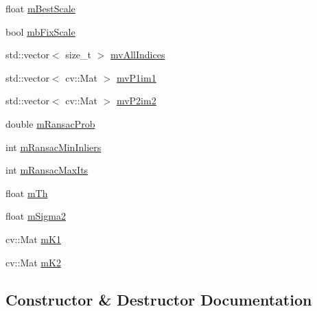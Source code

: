\begin{DoxyCompactItemize}
\item 
float \mbox{\hyperlink{class_o_r_b___s_l_a_m2_1_1_sim3_solver_ab10aee88f18c5a5b80aabb5c21a6489c}{m\+Best\+Scale}}
\item 
bool \mbox{\hyperlink{class_o_r_b___s_l_a_m2_1_1_sim3_solver_a39aa9674bb73b257e0d834cbec52acce}{mb\+Fix\+Scale}}
\item 
std\+::vector$<$ size\+\_\+t $>$ \mbox{\hyperlink{class_o_r_b___s_l_a_m2_1_1_sim3_solver_abcc39b417f6d09e436d39712fb2a2b11}{mv\+All\+Indices}}
\item 
std\+::vector$<$ cv\+::\+Mat $>$ \mbox{\hyperlink{class_o_r_b___s_l_a_m2_1_1_sim3_solver_af39b00b7b87b0d240503884a927e5f5b}{mv\+P1im1}}
\item 
std\+::vector$<$ cv\+::\+Mat $>$ \mbox{\hyperlink{class_o_r_b___s_l_a_m2_1_1_sim3_solver_a8e6a6be273522fdeeecd9fd7d3c07b9c}{mv\+P2im2}}
\item 
double \mbox{\hyperlink{class_o_r_b___s_l_a_m2_1_1_sim3_solver_aba7cc52c8995b747eda6fbdb02e719b9}{m\+Ransac\+Prob}}
\item 
int \mbox{\hyperlink{class_o_r_b___s_l_a_m2_1_1_sim3_solver_a67cd1b0b3d88691f85776f85aed0c496}{m\+Ransac\+Min\+Inliers}}
\item 
int \mbox{\hyperlink{class_o_r_b___s_l_a_m2_1_1_sim3_solver_a98e30ee1a61e81e3f864b41e56eed0f6}{m\+Ransac\+Max\+Its}}
\item 
float \mbox{\hyperlink{class_o_r_b___s_l_a_m2_1_1_sim3_solver_ad3d4d9b7d09902e156178987d5898625}{m\+Th}}
\item 
float \mbox{\hyperlink{class_o_r_b___s_l_a_m2_1_1_sim3_solver_a9ea7da2fe7cb33526dc3fd60b556cde8}{m\+Sigma2}}
\item 
cv\+::\+Mat \mbox{\hyperlink{class_o_r_b___s_l_a_m2_1_1_sim3_solver_af802b30069d1bf8d7c6236a695525a10}{m\+K1}}
\item 
cv\+::\+Mat \mbox{\hyperlink{class_o_r_b___s_l_a_m2_1_1_sim3_solver_ae647640668c16a2716db73a43c812e7a}{m\+K2}}
\end{DoxyCompactItemize}


\subsection{Constructor \& Destructor Documentation}
\mbox{\label{class_o_r_b___s_l_a_m2_1_1_sim3_solver_ac4825895bc1a5a74fc71cd4fbfd4f2a6}} 

